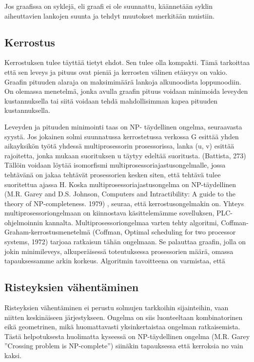 \documentclass[finnish,12pt]{article}
\begin{document}
Jos graafissa on syklejä, eli graafi ei ole suunnattu, käännetään syklin aiheuttavien lankojen suunta ja tehdyt muutokset merkitään muistiin.

		\subsection{Kerrostus}

Kerrostuksen tulee täyttää tietyt ehdot.
Sen tulee olla kompakti.
Tämä tarkoittaa että sen leveys ja pituus ovat pieniä ja kerrosten välinen etäisyys on vakio.
Graafin pituuden alaraja on maksimimäärä lankoja alkunoodista loppunoodiin.
On olemassa menetelmä, jonka avulla graafin pituus voidaan minimoida leveyden kustannuksella tai siitä voidaan tehdä mahdollisimman kapea pituuden kustannuksella.

Leveyden ja pituuden minimointi taas on NP- täydellinen ongelma, seuraavasta syystä.
Jos jokainen solmi suunnatussa kerrostetussa verkossa G esittää yhden aikayksikön työtä yhdessä multiprosessorin prosessorissa, lanka (u, v) esittää rajoitetta, jonka mukaan suorituksen u täytyy edeltää suoritusta. (Battista, 273)
Tällöin voidaan löytää isomorfismi multiprosessoriajastusongelmalle, jossa tehtävänä on jakaa tehtävät prosessorien kesken siten, että tehtävä tulee suoritettua ajassa H.
Koska multiprosessoriajastusongelma on NP-täydellinen (M.R. Garey and D.S. Johnson, Computers and Intractibility: A guide to the theory of NP-completeness. 1979) , seuraa, että kerrostusongelmakin on.
Yhteys multiprosessoriongelmaan on kiinnostava käsittelemämme sovelluksen, PLC-ohjelmoinnin kannalta.
Multiprosessoriongelmaa varten tehty algoritmi, Coffman-Graham-kerrostusmenetelmä (Coffman, Optimal scheduling for two processor systems, 1972) tarjoaa ratkaisun tähän ongelmaan.
Se palauttaa graafin, jolla on jokin minimileveys, alkuperäisessä toteutuksessa prosessorien määrä, omassa tapauksessamme arkin korkeus. 
Algoritmin tavoitteena on varmistaa, että 

		\subsection{Risteyksien vähentäminen}

Risteyksien vähentäminen ei perustu solmujen tarkkoihin sijainteihin, vaan niitten keskinäiseen järjestykseen.
Ongelma on siis luonteeltaan kombinatorinen eikä geometrinen, mikä huomattavasti yksinkertaistaa ongelman ratkaisemista. 
Tästä helpotuksesta huolimatta kyseessä on NP-täydellinen ongelma (M.R. Garey ”Crossing problem is NP-complete”) siinäkin tapauksessa että kerroksia no vain kaksi.
\end{document}
